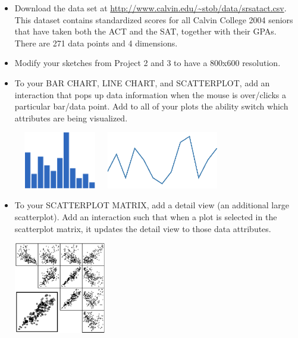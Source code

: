\documentclass[a4paper,12pt]{article}
\begin{document}
\begin{itemize}

\item Download the data set at \url{
http://www.calvin.edu/~stob/data/srsatact.csv}. This dataset contains standardized scores for all Calvin College 2004 seniors that have taken both the ACT and the SAT, together with their GPAs. There are 271 data points and 4 dimensions.

\item Modify your sketches from Project 2 and 3 to have a 800x600 resolution. 

\item To your BAR CHART, LINE CHART, and SCATTERPLOT, add an interaction that pops up data information when the mouse is over/clicks a particular bar/data point. Add to all of your plots the ability switch which attributes are being visualized.

\begin{center}
\includegraphics[width=4cm, height=2.5cm]{images/barchart.png} 
\hspace{15pt}
\includegraphics[height=2.5cm]{images/linechart.png} 
\hspace{15pt}
\end{center}

\item To your SCATTERPLOT MATRIX, add a detail view (an additional large scatterplot). Add an interaction such that when a plot is selected in the scatterplot matrix, it updates the detail view to those data attributes.

\begin{center}
\includegraphics[width=4cm]{images/splom+detail.png} 
\end{center}


\end{itemize}
\end{document}
